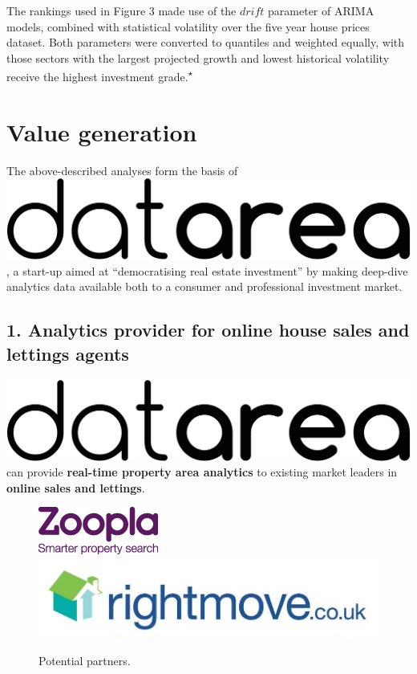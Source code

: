 \documentclass[
10pt, %
a4paper, %
oneside, %
headinclude,footinclude, %
BCOR5mm, %
]{scrartcl}
\newcommand*{\logo}{\includegraphics[scale=.04]{Figures/logotext.png}}
\begin{document}
The rankings used in Figure 3 made use of the $drift$ parameter of
ARIMA models, combined with statistical volatility over the five year
house prices dataset. Both parameters were converted to quantiles and
weighted equally, with those sectors with the largest projected growth
and lowest historical volatility receive the highest investment grade.\textsuperscript{$\star$}

{\let\thefootnote\relax{}}

\section*{Value generation}

The above-described analyses form the basis of \logo\hspace{.1em}, a
start-up aimed at ``democratising real estate investment'' by
making deep-dive analytics data available both to a consumer and
professional investment market.

\subsection*{1. Analytics provider for online house sales and lettings
agents}

\logo\hspace{.1em} can provide {\bf real-time property area analytics} to
existing market leaders in {\bf online sales and lettings}. 

\begin{figure}
\begin{center}
\includegraphics[width=.18\textwidth]{Figures/zoopla.png}
\includegraphics[width=.23\textwidth]{Figures/rightmove.jpg}
\caption*{ Potential partners. }
\end{center}
\end{figure}
\end{document}
